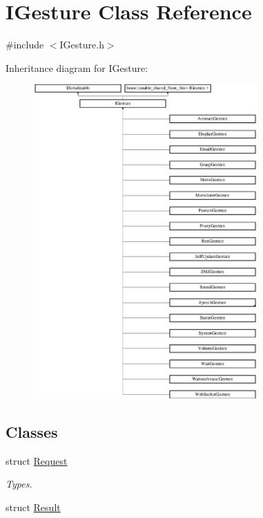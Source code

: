 \hypertarget{class_i_gesture}{}\section{I\+Gesture Class Reference}
\label{class_i_gesture}


{\ttfamily \#include $<$I\+Gesture.\+h$>$}

Inheritance diagram for I\+Gesture\+:\begin{figure}[H]
\begin{center}
\leavevmode
\includegraphics[height=12.000000cm]{class_i_gesture}
\end{center}
\end{figure}
\subsection*{Classes}
\begin{DoxyCompactItemize}
\item 
struct \hyperlink{struct_i_gesture_1_1_request}{Request}
\begin{DoxyCompactList}\small\item\em Types. \end{DoxyCompactList}\item 
struct \hyperlink{struct_i_gesture_1_1_result}{Result}
\end{DoxyCompactItemize}
